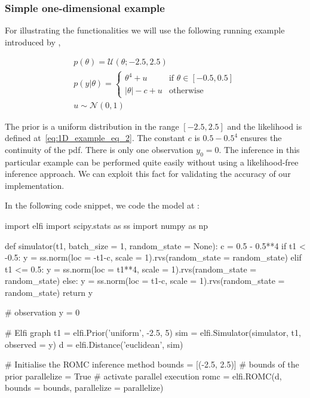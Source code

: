 \subsubsection*{Simple one-dimensional example}

For illustrating the functionalities we will use the following running
example introduced by \citet{Ikonomov2019},

\begin{gather} \label{eq:1D_example}
  p(\theta) = \mathcal{U}(\theta;-2.5,2.5)\\ \label{eq:1D_example_eq_2}
  p(y|\theta) = \left\{
    \begin{array}{ll} \theta^4 + u & \mbox{if } \theta \in [-0.5, 0.5]
\\ |\theta| - c + u & \mbox{otherwise}
    \end{array} \right.\\ 
  u \sim \mathcal{N}(0,1)
\end{gather}

\noindent

The prior is a uniform distribution in the range \([-2.5, 2.5]\) and
the likelihood is defined at~\ref{eq:1D_example_eq_2}. The constant
\(c\) is \(0.5 - 0.5^4\) ensures the continuity of the pdf. There is
only one observation \(y_0 = 0\). The inference in this particular
example can be performed quite easily without using a likelihood-free
inference approach. We can exploit this fact for validating the
accuracy of our implementation.

In the following code snippet, we code the model at :

\begin{Code}
import elfi
import scipy.stats as ss
import numpy as np

def simulator(t1, batch_size = 1, random_state = None):
    c = 0.5 - 0.5**4
    if t1 < -0.5:
        y = ss.norm(loc = -t1-c, scale = 1).rvs(random_state = random_state)
    elif t1 <= 0.5:
        y = ss.norm(loc = t1**4, scale = 1).rvs(random_state = random_state)
    else:
        y = ss.norm(loc = t1-c, scale = 1).rvs(random_state = random_state)
    return y

# observation
y = 0

# Elfi graph
t1 = elfi.Prior('uniform', -2.5, 5)
sim = elfi.Simulator(simulator, t1, observed = y)
d = elfi.Distance('euclidean', sim)

# Initialise the ROMC inference method
bounds = [(-2.5, 2.5)] # bounds of the prior
parallelize = True # activate parallel execution
romc = elfi.ROMC(d, bounds = bounds, parallelize = parallelize)
\end{Code}

